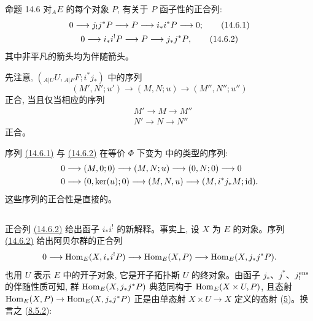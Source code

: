 \begin{enonce*}{命题 14.6}
对\pageoriginale ${}_AE$ 的每个对象 $P$, 有关于 $P$ 函子性的正合列:
\hypertarget{sga4.exp.IV.equation.14.6.1}{}\begin{gather}
0\longrightarrow j_{!}j^{\ast}P\longrightarrow P\longrightarrow
i_{\ast}i^{\ast}P\longrightarrow 0{};\tag{14.6.1}\\
0\longrightarrow i_{\ast}i^{!}P\longrightarrow P\longrightarrow
j_{\ast}j^{\ast}P{},\tag{14.6.2}
\end{gather}\hypertarget{sga4.exp.IV.equation.14.6.2}{}
其中非平凡的箭头均为伴随箭头。
\end{enonce*}

先注意, $({}_{A|U}U,{}_{A|F}F;i^{\ast}j_{\ast})$ 中的序列
$$
(M',N';u')\longrightarrow(M,N;u)\longrightarrow(M'',N'';u'')
$$
正合, 当且仅当相应的序列
\begin{align*}
& M'\longrightarrow M\longrightarrow M''\\
& N'\longrightarrow N\longrightarrow N''
\end{align*}
正合。

序列 \hyperlink{sga4.exp.IV.equation.14.6.1}{(14.6.1)} 与 \hyperlink{sga4.exp.IV.equation.14.6.2}{(14.6.2)} 在等价 $\Phi$ 下变为  中的类型的序列:
\begin{align*}
& 0\longrightarrow (M,0;0)\longrightarrow(M,N;u)\longrightarrow
(0,N;0)\longrightarrow 0\\
& 0\longrightarrow(0,\ker(u);0)\longrightarrow
(M,N,u)\longrightarrow(M,i^{\ast}j_{\ast}M;\operatorname{id}){}.
\end{align*}
这些序列的正合性是直接的。

\setcounter{subsection}{6}
\subsection{}
正合列 \hyperlink{sga4.exp.IV.equation.14.6.2}{(14.6.2)} 给出函子 $i_{\ast}i^{!}$ 的新解释。事实上, 设 $X$ 为 $E$ 的对象。序列 \hyperlink{sga4.exp.IV.equation.14.6.2}{(14.6.2)} 给出阿贝尔群的正合列
$$
0\longrightarrow \operatorname{Hom}_E(X,i_{\ast}i^{!}P)\longrightarrow
\operatorname{Hom}_E(X,P)\longrightarrow \operatorname{Hom}_E(X,j_{\ast}j^{\ast}P){}.
$$
也用 $U$ 表示 $E$ 中的开子对象, 它是开子拓扑斯 $U$ 的终对象。由函子 $j_{\ast}$、$j^{\ast}$、$j_{!}^{\operatorname{ens}}$ 的伴随性质可知, 群 $\operatorname{Hom}_E(X,j_{\ast}j^{\ast}P)$ 典范同构于 $\operatorname{Hom}_E(X\times U,P)$, 且态射 $\operatorname{Hom}_E(X,P)\rightarrow\operatorname{Hom}_E(X,j_{\ast}j^{\ast}P)$ 正是由单态射 $X\times U\rightarrow X$ 定义的态射 (\hyperref[IV.sec5]{5})。换言之 (\hyperref[IV.subsubsec8.5.2]{8.5.2}):

